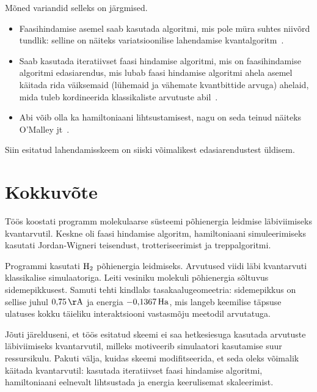\documentclass[12pt]{report}
\begin{document}
Mõned variandid selleks on järgmised.
\begin{itemize}
  \item Faasihindamise asemel saab kasutada algoritmi, mis pole müra suhtes niivõrd tundlik: selline on näiteks variatsioonilise lahendamise kvantalgoritm~\cite{omalley+etal, raidlo}.
  \item Saab kasutada iteratiivset faasi hindamise algoritmi, mis on faasihindamise algoritmi edasiarendus, mis lubab faasi hindamise algoritmi ahela asemel käitada rida väiksemaid (lühemaid ja vähemate kvantbittide arvuga) ahelaid, mida tuleb kordineerida klassikaliste arvutuste abil~\cite{whitfield+etal2011, omalley+etal}.
  \item Abi võib olla ka hamiltoniaani lihtsustamisest, nagu on seda teinud näiteks O'Malley jt~\cite{omalley+etal}.
\end{itemize}
Siin esitatud lahendamisskeem on siiski võimalikest edasiarendustest üldisem.

\chapter{Kokkuvõte}

Töös koostati programm molekulaarse süsteemi põhienergia leidmise läbiviimiseks kvantarvutil.
Keskne oli faasi hindamise algoritm, hamiltoniaani simuleerimiseks kasutati Jordan-Wigneri teisendust, trotteriseerimist ja treppalgoritmi.

Programmi kasutati \(\rm H_2\) põhienergia leidmiseks.
Arvutused viidi läbi kvantarvuti klassikalise simulaatoriga.
Leiti vesiniku molekuli põhienergia sõltuvus sidemepikkusest.
Samuti tehti kindlaks tasakaalugeomeetria: sidemepikkus on sellise juhul \(0{,}75\,{\rm Å}\) ja energia \(-0{,}1367\,{\rm Ha}\), mis langeb keemilise täpsuse ulatuses kokku täieliku interaktsiooni vastasmõju meetodil arvutatuga.

Jõuti järelduseni, et töös esitatud skeemi ei saa hetkesiesuga kasutada arvutuste läbiviimiseks kvantarvutil, milleks motiveerib simulaatori kasutamise suur ressursikulu.
Pakuti välja, kuidas skeemi modifitseerida, et seda oleks võimalik käitada kvantarvutil: kasutada iteratiivset faasi hindamise algoritmi, hamiltoniaani eelnevalt lihtsustada ja energia keerulisemat skaleerimist.

\printbibliography[heading=bibintoc, title=Kirjandus]
\end{document}
